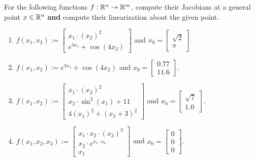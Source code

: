 \begin{example} 
\label{ex:PartialDerivativesByHand}
For the following functions $f:\mathbb R^{n} \to \mathbb R^{m}$, compute their Jacobians at a general point $x \in \mathbb R^{n}$ \textbf{and} compute their linearization about the given point. 

\begin{enumerate}
\renewcommand{\labelenumi}{(\alph{enumi})}
\setlength{\itemsep}{.4cm}
    \item $f(x_1, x_2) := \left[ \begin{array}{c}
         x_1 \cdot (x_2)^2 \\ e^{3x_1} + \cos(4 x_2)
    \end{array}\right]$ and $x_0 = \left[ \begin{array}{c}
         \sqrt{2} \\ \pi
    \end{array}\right]$. 

        \item $f(x_1, x_2) := e^{3x_1} + \cos(4 x_2)$ and $x_0 = \left[ \begin{array}{c}
         0.77 \\ 11.6
    \end{array}\right]$. 

    \item  $f(x_1, x_2) := \left[ \begin{array}{c}
         x_1 \cdot (x_2)^2 \\ x_2 \cdot \sin^3(x_1) + 11 \\ 4 (x_1)^2 + (x_2 + 3)^2
    \end{array}\right]$ and $x_0 = \left[ \begin{array}{c}
         \sqrt{7} \\ 1.0
    \end{array}\right]$.

        \item  $f(x_1, x_2, x_3) := \left[ \begin{array}{c}
         x_1 \cdot x_2 \cdot (x_3)^3 \\ x_2 \cdot e^{x_1 \cdot x_3} \\ x_1 
    \end{array}\right]$ and $x_0 = \left[ \begin{array}{c}
         0\\ 0 \\ 0
    \end{array}\right]$.    
    \end{enumerate}
\end{example}

